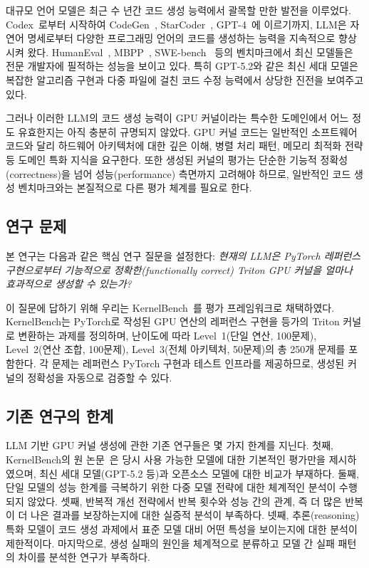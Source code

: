 \documentclass[sigplan,screen,review,anonymous]{acmart}
\begin{document}
대규모 언어 모델은 최근 수 년간 코드 생성 능력에서 괄목할 만한 발전을 이루었다.
Codex~\cite{chen2021codex}로부터 시작하여 CodeGen~\cite{nijkamp2023codegen},
StarCoder~\cite{li2023starcoder}, GPT-4~\cite{openai2023gpt4}에 이르기까지,
LLM은 자연어 명세로부터 다양한 프로그래밍 언어의 코드를 생성하는 능력을
지속적으로 향상시켜 왔다.
HumanEval~\cite{chen2021codex}, MBPP~\cite{austin2021mbpp},
SWE-bench~\cite{jimenez2024swebench} 등의 벤치마크에서
최신 모델들은 전문 개발자에 필적하는 성능을 보이고 있다.
특히 GPT-5.2와 같은 최신 세대 모델은 복잡한 알고리즘 구현과
다중 파일에 걸친 코드 수정 능력에서 상당한 진전을 보여주고 있다.

그러나 이러한 LLM의 코드 생성 능력이 GPU 커널이라는
특수한 도메인에서 어느 정도 유효한지는 아직 충분히 규명되지 않았다.
GPU 커널 코드는 일반적인 소프트웨어 코드와 달리
하드웨어 아키텍처에 대한 깊은 이해, 병렬 처리 패턴,
메모리 최적화 전략 등 도메인 특화 지식을 요구한다.
또한 생성된 커널의 평가는 단순한 기능적 정확성(correctness)을 넘어
성능(performance) 측면까지 고려해야 하므로,
일반적인 코드 생성 벤치마크와는 본질적으로 다른 평가 체계를 필요로 한다.

\subsection{연구 문제}

본 연구는 다음과 같은 핵심 연구 질문을 설정한다:
\textit{현재의 LLM은 PyTorch 레퍼런스 구현으로부터
기능적으로 정확한(functionally correct) Triton GPU 커널을
얼마나 효과적으로 생성할 수 있는가?}

이 질문에 답하기 위해 우리는 KernelBench~\cite{ouyang2024kernelbench}를
평가 프레임워크로 채택하였다.
KernelBench는 PyTorch로 작성된 GPU 연산의 레퍼런스 구현을
등가의 Triton 커널로 변환하는 과제를 정의하며,
난이도에 따라 Level~1(단일 연산, 100문제),
Level~2(연산 조합, 100문제), Level~3(전체 아키텍처, 50문제)의
총 250개 문제를 포함한다.
각 문제는 레퍼런스 PyTorch 구현과 테스트 인프라를 제공하므로,
생성된 커널의 정확성을 자동으로 검증할 수 있다.

\subsection{기존 연구의 한계}

LLM 기반 GPU 커널 생성에 관한 기존 연구들은 몇 가지 한계를 지닌다.
첫째, KernelBench의 원 논문~\cite{ouyang2024kernelbench}은
당시 사용 가능한 모델에 대한 기본적인 평가만을 제시하였으며,
최신 세대 모델(GPT-5.2 등)과 오픈소스 모델에 대한 비교가 부재하다.
둘째, 단일 모델의 성능 한계를 극복하기 위한 다중 모델 전략에 대한
체계적인 분석이 수행되지 않았다.
셋째, 반복적 개선 전략에서 반복 횟수와 성능 간의 관계,
즉 더 많은 반복이 더 나은 결과를 보장하는지에 대한
실증적 분석이 부족하다.
넷째, 추론(reasoning) 특화 모델이 코드 생성 과제에서
표준 모델 대비 어떤 특성을 보이는지에 대한 분석이 제한적이다.
마지막으로, 생성 실패의 원인을 체계적으로 분류하고
모델 간 실패 패턴의 차이를 분석한 연구가 부족하다.
\end{document}
